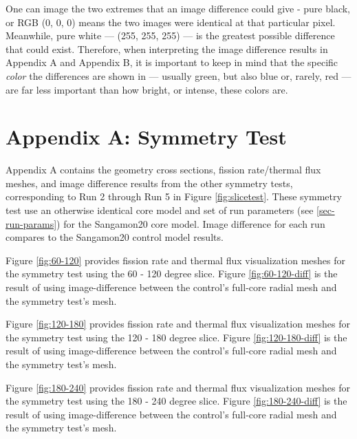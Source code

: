 One can image the two extremes that an image difference could give - pure black, or RGB (0, 0, 0) means the two images were identical at that particular pixel.  Meanwhile, pure white --- (255, 255, 255) --- is the greatest possible difference that could exist.  Therefore, when interpreting the image difference results in Appendix A and Appendix B, it is important to keep in mind that the specific \emph{color} the differences are shown in --- usually green, but also blue or, rarely, red --- are far less important than how bright, or intense, these colors are.

\section{Appendix A: Symmetry Test}
\label{app-sym}

Appendix A contains the geometry cross sections, fission rate/thermal flux meshes, and image difference results from the other symmetry tests, corresponding to Run 2 through Run 5 in Figure \ref{fig:slicetest}.  These symmetry test use an otherwise identical core model and set of run parameters (see \autoref{sec-run-params}) for the Sangamon20 core model.  Image difference for each run compares to the Sangamon20 control model results.





Figure \ref{fig:60-120} provides fission rate and thermal flux visualization meshes for the symmetry test using the 60 - 120 degree slice.  Figure \ref{fig:60-120-diff} is the result of using image-difference between the control's full-core radial mesh and the symmetry test's mesh.




Figure \ref{fig:120-180} provides fission rate and thermal flux visualization meshes for the symmetry test using the 120 - 180 degree slice.  Figure \ref{fig:120-180-diff} is the result of using image-difference between the control's full-core radial mesh and the symmetry test's mesh.




Figure \ref{fig:180-240} provides fission rate and thermal flux visualization meshes for the symmetry test using the 180 - 240 degree slice.  Figure \ref{fig:180-240-diff} is the result of using image-difference between the control's full-core radial mesh and the symmetry test's mesh.




